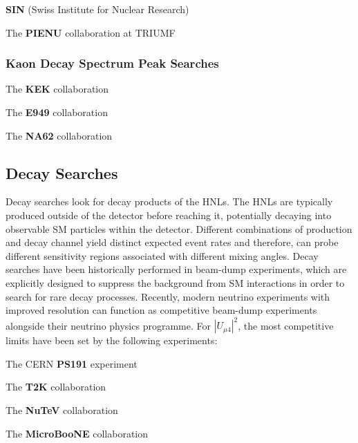 \begin{coloritemize}
	\item \textbf{SIN} (Swiss Institute for Nuclear Research) \cite{SIN1, SIN2, SIN3} 
	\item The \textbf{PIENU} collaboration at TRIUMF \cite{PIENU}
\end{coloritemize}

\subsubsection{Kaon Decay Spectrum Peak Searches}

\begin{coloritemize}
	\item The \textbf{KEK} collaboration \cite{KEK1, KEK2}
	\item The \textbf{E949} collaboration \cite{E949}
	\item The \textbf{NA62} collaboration \cite{NA62A, NA62B}
\end{coloritemize}

\subsection{Decay Searches}

Decay searches look for decay products of the HNLs.
The HNLs are typically produced outside of the detector before reaching it, potentially decaying into observable SM particles within the detector.
Different combinations of production and decay channel yield distinct expected event rates and therefore, can probe different sensitivity regions associated with different mixing angles.
Decay searches have been historically performed in beam-dump experiments, which are explicitly designed to suppress the background from SM interactions in order to search for rare decay processes.
Recently, modern neutrino experiments with improved resolution can function as competitive beam-dump experiments alongside their neutrino physics programme.
For $|U_{\mu4}|^{2}$, the most competitive limits have been set by the following experiments:

\begin{coloritemize}
	\item The CERN \textbf{PS191} experiment \cite{PS191A, PS191B}
	\item The \textbf{T2K} collaboration \cite{T2KHNL}
	\item The \textbf{NuTeV} collaboration \cite{NuTeV}
	\item The \textbf{MicroBooNE} collaboration \cite{uboone1, uboone2, uboone3}	

\end{coloritemize}

